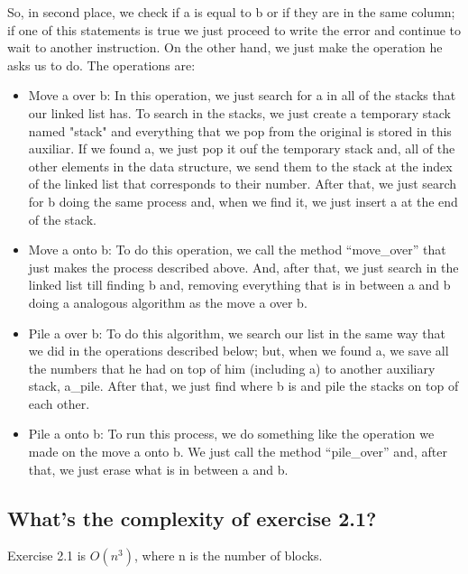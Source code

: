 \documentclass[a4paper,12pt]{article}
\begin{document}
    So, in second place, we check if a is equal to b or if they are in the same
    column; if one of this statements is true we just proceed to write the error
    and continue to wait to another instruction. On the other hand, we just make
    the operation he asks us to do. The operations are:
      \begin{itemize}
        \item Move a over b:
      In this operation, we just search for a in all of the stacks that our
      linked list has. To search in the stacks, we just create a temporary
      stack named "stack" and everything that we pop from the original is
      stored in this auxiliar. If we found a, we just pop it ouf the
      temporary stack and, all of the other elements in the data structure,
      we send them to the stack at the index of the linked list that
      corresponds to their number. After that, we just search for b doing
      the same process and, when we find it, we just insert a at the end of
      the stack.

      \item Move a onto b:
      To do this operation, we call the method ``move\_over'' that just makes
      the process described above. And, after that, we just search in the
      linked list till finding b and, removing everything that is in between
      a and b doing a analogous algorithm as the move a over b.

      \item Pile a over b:
      To do this algorithm, we search our list in the same way that we did
      in the operations described below; but, when we found a, we save all
      the numbers that he had on top of him (including a) to another
      auxiliary stack, a\_pile. After that, we just find where b is and
      pile the stacks on top of each other.

      \item Pile a onto b:
      To run this process, we do something like the operation we made on the
      move a onto b. We just call the method ``pile\_over'' and, after that,
      we just erase what is in between a and b.
      \end{itemize}

    \subsection{What's the complexity of exercise 2.1?}
    Exercise 2.1 is $O(n^3)$, where n is the number of blocks.
\end{document}
